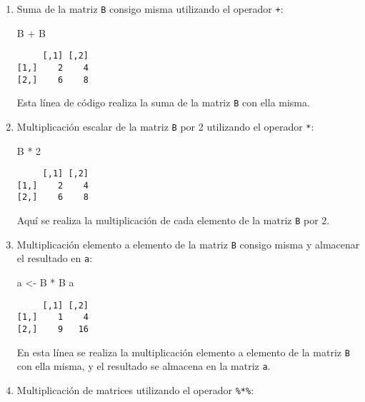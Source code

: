 \documentclass[
  a4paper,
]{article}
\newenvironment{Shaded}{}{}
\newcommand{\DecValTok}[1]{\textcolor[rgb]{0.00,0.36,0.77}{#1}}
\newcommand{\NormalTok}[1]{\textcolor[rgb]{0.14,0.16,0.18}{#1}}
\newcommand{\OtherTok}[1]{\textcolor[rgb]{0.44,0.26,0.76}{#1}}
\newcommand{\SpecialCharTok}[1]{\textcolor[rgb]{0.00,0.36,0.77}{#1}}
\begin{document}
\begin{enumerate}
\def\labelenumi{\arabic{enumi}.}
\item
  Suma de la matriz \texttt{B} consigo misma utilizando el operador
  \texttt{+}:

\begin{Shaded}
\begin{Highlighting}[]
\NormalTok{B }\SpecialCharTok{+}\NormalTok{ B}
\end{Highlighting}
\end{Shaded}

\begin{verbatim}
     [,1] [,2]
[1,]    2    4
[2,]    6    8
\end{verbatim}

  Esta línea de código realiza la suma de la matriz \texttt{B} con ella
  misma.
\item
  Multiplicación escalar de la matriz \texttt{B} por 2 utilizando el
  operador \texttt{*}:

\begin{Shaded}
\begin{Highlighting}[]
\NormalTok{B }\SpecialCharTok{*} \DecValTok{2}
\end{Highlighting}
\end{Shaded}

\begin{verbatim}
     [,1] [,2]
[1,]    2    4
[2,]    6    8
\end{verbatim}

  Aquí se realiza la multiplicación de cada elemento de la matriz
  \texttt{B} por 2.
\item
  Multiplicación elemento a elemento de la matriz \texttt{B} consigo
  misma y almacenar el resultado en \texttt{a}:

\begin{Shaded}
\begin{Highlighting}[]
\NormalTok{a }\OtherTok{\textless{}{-}}\NormalTok{ B }\SpecialCharTok{*}\NormalTok{ B}
\NormalTok{a}
\end{Highlighting}
\end{Shaded}

\begin{verbatim}
     [,1] [,2]
[1,]    1    4
[2,]    9   16
\end{verbatim}

  En esta línea se realiza la multiplicación elemento a elemento de la
  matriz \texttt{B} con ella misma, y el resultado se almacena en la
  matriz \texttt{a}.
\item
  Multiplicación de matrices utilizando el operador \texttt{\%*\%}:


\end{enumerate}
\end{document}
